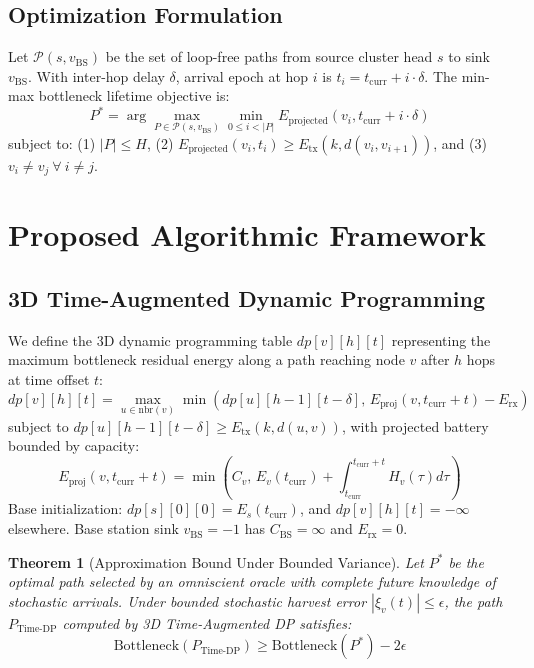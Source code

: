 \documentclass[journal]{IEEEtran}
\newtheorem{theorem}{Theorem}
\begin{document}
\subsection{Optimization Formulation}
Let $\mathcal{P}(s, v_{\text{BS}})$ be the set of loop-free paths from source cluster head $s$ to sink $v_{\text{BS}}$. With inter-hop delay $\delta$, arrival epoch at hop $i$ is $t_i = t_{\text{curr}} + i \cdot \delta$. The min-max bottleneck lifetime objective is:
\begin{equation}
P^* = \arg\max_{P \in \mathcal{P}(s, v_{\text{BS}})} \min_{0 \le i < |P|} E_{\text{projected}}(v_i, t_{\text{curr}} + i \cdot \delta)
\end{equation}
subject to: (1) $|P| \le H$, (2) $E_{\text{projected}}(v_i, t_i) \ge E_{\text{tx}}(k, d(v_i, v_{i+1}))$, and (3) $v_i \ne v_j\ \forall\ i \ne j$.

\section{Proposed Algorithmic Framework}

\subsection{3D Time-Augmented Dynamic Programming}
We define the 3D dynamic programming table $dp[v][h][t]$ representing the maximum bottleneck residual energy along a path reaching node $v$ after $h$ hops at time offset $t$:
\begin{equation}
dp[v][h][t] = \max_{u \in \text{nbr}(v)} \min\left( dp[u][h-1][t-\delta], \, E_{\text{proj}}(v, t_{\text{curr}} + t) - E_{\text{rx}} \right)
\end{equation}
subject to $dp[u][h-1][t-\delta] \ge E_{\text{tx}}(k, d(u, v))$, with projected battery bounded by capacity:
\begin{equation}
E_{\text{proj}}(v, t_{\text{curr}} + t) = \min\left( C_v, \, E_v(t_{\text{curr}}) + \int_{t_{\text{curr}}}^{t_{\text{curr}} + t} H_v(\tau) d\tau \right)
\end{equation}
Base initialization: $dp[s][0][0] = E_s(t_{\text{curr}})$, and $dp[v][h][t] = -\infty$ elsewhere. Base station sink $v_{\text{BS}} = -1$ has $C_{\text{BS}} = \infty$ and $E_{\text{rx}} = 0$.

\begin{theorem}[Approximation Bound Under Bounded Variance]
Let $P^*$ be the optimal path selected by an omniscient oracle with complete future knowledge of stochastic arrivals. Under bounded stochastic harvest error $|\xi_v(t)| \le \epsilon$, the path $P_{\text{Time-DP}}$ computed by 3D Time-Augmented DP satisfies:
\begin{equation}
\text{Bottleneck}(P_{\text{Time-DP}}) \ge \text{Bottleneck}(P^*) - 2\epsilon
\end{equation}
\end{theorem}
\end{document}
